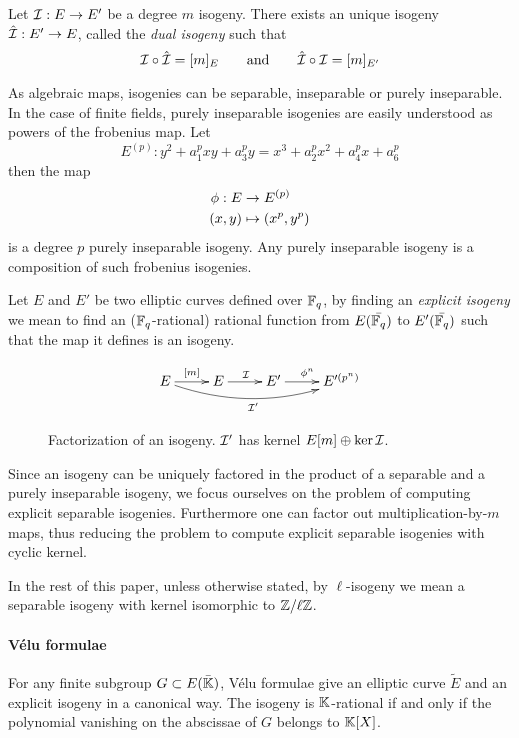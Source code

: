 \begin{definition}
  Let $\mathcal{I} : E \rightarrow E'$ be a degree $m$ isogeny. There exists an
  unique isogeny $\hat{\mathcal{I}} : E' \rightarrow E$, called the \emph{dual
    isogeny} such that
  \[\mathcal{I}\circ\hat{\mathcal{I}} = [m]_E \qquad\text{and}\qquad \hat{\mathcal{I}}\circ\mathcal{I} =
  [m]_{E'}\]
\end{definition}

As algebraic maps, isogenies can be separable, inseparable or purely
inseparable. In the case of finite fields, purely inseparable
isogenies are easily understood as powers of the frobenius map. Let
\[E^{(p)} : y^2 + a_1^pxy + a_3^py = x^3 + a_2^px^2 + a_4^px + a_6^p\]
then the map
\begin{align*}
  \phi : E &\rightarrow E^{(p)}\\
          (x,y) &\mapsto (x^p,y^p)
\end{align*}
is a degree $p$ purely inseparable isogeny. Any purely inseparable
isogeny is a composition of such frobenius isogenies.

Let $E$ and $E'$ be two elliptic curves defined over $\mathbb{F}_q$, by
finding an \emph{explicit isogeny} we mean to find an
($\mathbb{F}_q$-rational) rational function from $E(\bar{\mathbb{F}_q})$ to
$E'(\bar{\mathbb{F}_q})$ such that the map it defines is an isogeny.

\begin{figure}
  \centering
  \[\xymatrix{
    E \ar[r]^{[m]}\ar@/_1pc/[rrr]_{\I'} & E \ar[r]^\I & E' \ar[r]^{\frobisog^n} & E'^{(p^n)}\\
  }\]
  \caption{Factorization of an isogeny. $\mathcal{I}'$ has kernel $E[m]\oplus\ker\mathcal{I}$.}
\end{figure}

Since an isogeny can be uniquely factored in the product of a
separable and a purely inseparable isogeny, we focus ourselves on the
problem of computing explicit separable isogenies. Furthermore one can
factor out multiplication-by-$m$ maps, thus reducing the problem to
compute explicit separable isogenies with cyclic kernel.

In the rest of this paper, unless otherwise stated, by $\ell$-isogeny
we mean a separable isogeny with kernel isomorphic to $\mathbb{Z}/\ell\mathbb{Z}$.

\paragraph{Vélu formulae}
For any finite subgroup $G \subset E(\bar{\mathbb{K}})$, Vélu formulae
\cite{Vel71} give an elliptic curve $\tilde{E}$ and an explicit
isogeny in a canonical way. The isogeny is $\mathbb{K}$-rational if and only
if the polynomial vanishing on the abscissae of $G$ belongs to
$\mathbb{K}[X]$.

